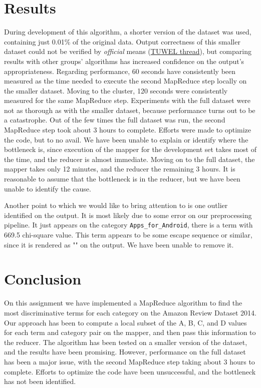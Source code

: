 \documentclass[11pt]{article}
\begin{document}
\section{Results}

During development of this algorithm, a shorter version of the dataset was used, containing just 0.01\% of the original data. Output correctness of this smaller dataset could not be verified by \textit{official} means (\href{https://tuwel.tuwien.ac.at/mod/forum/discuss.php?d=423734}{TUWEL thread}), but comparing results with other groups' algorithms has increased confidence on the output's appropriateness. Regarding performance, 60 seconds have consistently been measured as the time needed to execute the second MapReduce step locally on the smaller dataset. Moving to the cluster, 120 seconds were consistently measured for the same MapReduce step. Experiments with the full dataset were not as thorough as with the smaller dataset, because performance turns out to be a catastrophe. Out of the few times the full dataset was run, the second MapReduce step took about 3 hours to complete. Efforts were made to optimize the code, but to no avail. We have been unable to explain or identify where the bottleneck is, since execution of the mapper for the development set takes most of the time, and the reducer is almost immediate. Moving on to the full dataset, the mapper takes only 12 minutes, and the reducer the remaining 3 hours. It is reasonable to assume that the bottleneck is in the reducer, but we have been unable to identify the cause.

Another point to which we would like to bring attention to is one outlier identified on the output. It is most likely due to some error on our preprocessing pipeline. It just appears on the category \verb|Apps_for_Android|, there is a term with 669.5 chi-square value. This term appears to be some escape sequence or similar, since it is rendered as "" on the output. We have been unable to remove it.

\section{Conclusion}

On this assignment we have implemented a MapReduce algorithm to find the most discriminative terms for each category on the Amazon Review Dataset 2014. Our approach has been to compute a local subset of the A, B, C, and D values for each term and category pair on the mapper, and then pass this information to the reducer. The algorithm has been tested on a smaller version of the dataset, and the results have been promising. However, performance on the full dataset has been a major issue, with the second MapReduce step taking about 3 hours to complete. Efforts to optimize the code have been unsuccessful, and the bottleneck has not been identified.

\label{LastMainPage}
\end{document}
